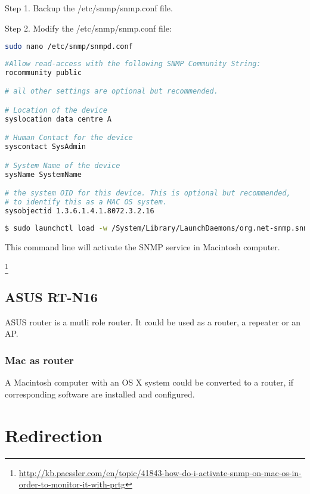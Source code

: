 Step 1. Backup the /etc/snmp/snmp.conf file.

Step 2. Modify the /etc/snmp/snmp.conf file:

\begin{lstlisting}[language=bash]
sudo nano /etc/snmp/snmpd.conf
\end{lstlisting}

\begin{lstlisting}[language=bash]
#Allow read-access with the following SNMP Community String:
rocommunity public

# all other settings are optional but recommended.

# Location of the device
syslocation data centre A

# Human Contact for the device
syscontact SysAdmin

# System Name of the device
sysName SystemName

# the system OID for this device. This is optional but recommended,
# to identify this as a MAC OS system.
sysobjectid 1.3.6.1.4.1.8072.3.2.16
\end{lstlisting}

\begin{lstlisting}[language=bash]
$ sudo launchctl load -w /System/Library/LaunchDaemons/org.net-snmp.snmpd.plist
\end{lstlisting}

This command line will activate the SNMP service in Macintosh computer.



\footnote{\url{http://kb.paessler.com/en/topic/41843-how-do-i-activate-snmp-on-mac-os-in-order-to-monitor-it-with-prtg}}

\subsection{ASUS RT-N16}

ASUS router is a mutli role router. It could be used as a router, a repeater or an AP.

\subsubsection{Mac as router}

A Macintosh computer with an OS X system could be converted to a router, if corresponding software are installed and configured.

\section{Redirection}

